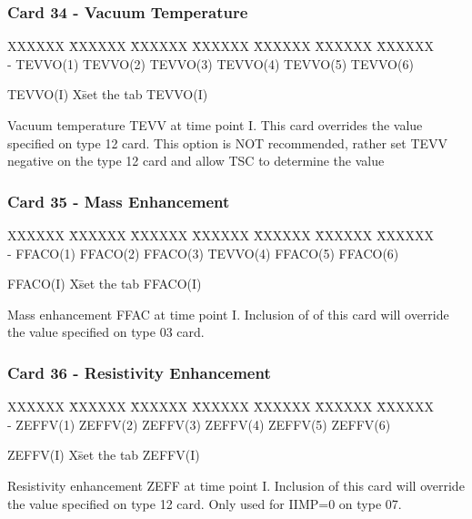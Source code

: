 \newpage \subsubsection{Card 34 - Vacuum Temperature}
 
\begin{tabbing}
XXXXXX \= XXXXXX \= XXXXXX \= XXXXXX \= XXXXXX \= XXXXXX \=
XXXXXX       \\
\footnotesize  -  \>\footnotesize TEVVO(1)  \>\footnotesize TEVVO(2) \>\footnotesize
TEVVO(3) \>\footnotesize TEVVO(4) \>\footnotesize TEVVO(5) \>\footnotesize TEVVO(6)
\end{tabbing}
\begin{tabbing}
TEVVO(I) X\= set the tab \kill
TEVVO(I) \> \parbox[t]{\width}{Vacuum temperature TEVV at time point I. This
card overrides the value specified on type 12 card.  This option is NOT
recommended, rather set TEVV negative on the type 12 card and allow TSC
to determine the value}
\end{tabbing}
\newpage \subsubsection{Card 35 - Mass Enhancement}
\begin{tabbing}
XXXXXX \= XXXXXX \= XXXXXX \= XXXXXX \= XXXXXX \= XXXXXX \=
XXXXXX       \\
\footnotesize  -  \>\footnotesize FFACO(1)  \>\footnotesize FFACO(2) \>\footnotesize FFACO(3)
\>\footnotesize TEVVO(4) \>\footnotesize FFACO(5) \>\footnotesize FFACO(6)
\end{tabbing}
\begin{tabbing}
FFACO(I) X\= set the tab \kill
FFACO(I) \>\parbox[t]{\width}{Mass enhancement FFAC at time point I.  Inclusion of of this card
will override the value specified on type 03 card.}
\end{tabbing}
\newpage \subsubsection{Card 36 - Resistivity Enhancement}
\begin{tabbing}
XXXXXX \= XXXXXX \= XXXXXX \= XXXXXX \= XXXXXX \= XXXXXX \=
XXXXXX       \\
\footnotesize  -  \>\footnotesize ZEFFV(1)  \>\footnotesize ZEFFV(2) \>\footnotesize ZEFFV(3)
\>\footnotesize ZEFFV(4) \>\footnotesize ZEFFV(5) \>\footnotesize ZEFFV(6)
\end{tabbing}
\begin{tabbing}
ZEFFV(I) X\= set the tab \kill
ZEFFV(I) \> \parbox[t]{\width}{Resistivity enhancement ZEFF at time point I.  Inclusion of this
card will override the value specified on type 12 card.  Only used for IIMP=0 on type 07.}
\end{tabbing}

